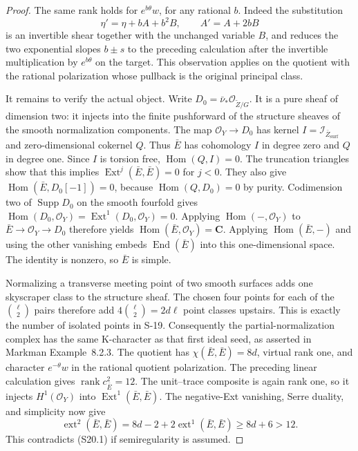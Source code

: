 \begin{proof}
The same rank holds for $e^{b\theta}w$, for any rational $b$.
Indeed the substitution
\[
 \eta' =\eta+bA+b^2B,\qquad A'=A+2bB
\]
is an invertible shear together with the unchanged variable
$B$, and reduces the two exponential slopes $b\pm s$ to
the preceding calculation after the invertible multiplication
by $e^{b\theta}$ on the target. This observation applies on
the quotient with the rational polarization whose pullback
is the original principal class.

It remains to verify the actual object. Write
$D_0=\bar\nu_*\mathcal O_{\widetilde Z/G}$.
It is a pure sheaf of dimension two: it injects into the
finite pushforward of the structure sheaves of the smooth
normalization components. The map $\mathcal O_Y\to D_0$
has kernel $I=\mathcal I_{\bar Z_{\mathrm{surf}}}$ and
zero-dimensional cokernel $Q$. Thus $\bar E$ has cohomology
$I$ in degree zero and $Q$ in degree one.
Since $I$ is torsion free,
$\operatorname{Hom}(Q,I)=0$. The truncation triangles show
that this implies
$\operatorname{Ext}^{j}(\bar E,\bar E)=0$ for $j<0$.
They also give
$\operatorname{Hom}(\bar E,D_0[-1])=0$, because
$\operatorname{Hom}(Q,D_0)=0$ by purity.
Codimension two of $\operatorname{Supp}D_0$ on the smooth
fourfold gives
$\operatorname{Hom}(D_0,\mathcal O_Y)
=\operatorname{Ext}^1(D_0,\mathcal O_Y)=0$.
Applying $\operatorname{Hom}(-,\mathcal O_Y)$ to
$\bar E\to\mathcal O_Y\to D_0$ therefore yields
$\operatorname{Hom}(\bar E,\mathcal O_Y)=\mathbf C$.
Applying $\operatorname{Hom}(\bar E,-)$ and using the other
vanishing embeds $\operatorname{End}(\bar E)$ into this
one-dimensional space. The identity is nonzero, so
$\bar E$ is simple.

Normalizing a transverse meeting point of two smooth
surfaces adds one skyscraper class to the structure sheaf.
The chosen four points for each of the $\binom\ell2$ pairs
therefore add $4\binom\ell2=2d\ell$ point classes upstairs.
This is exactly the number of isolated points in S-19.
Consequently the partial-normalization complex has the same
K-character as that first ideal seed, as asserted in
Markman Example~8.2.3. The quotient has
$\chi(\bar E,\bar E)=8d$, virtual rank one, and character
$e^{-\theta}w$ in the rational quotient polarization.
The preceding linear calculation gives
$\operatorname{rank}c_{\bar E}^2=12$.
The unit--trace composite is again rank one, so it injects
$H^1(\mathcal O_Y)$ into
$\operatorname{Ext}^1(\bar E,\bar E)$.
The negative-Ext vanishing, Serre duality, and simplicity
now give
\[
 \operatorname{ext}^2(\bar E,\bar E)
 =8d-2+2\operatorname{ext}^1(\bar E,\bar E)
 \ge8d+6>12.
\]
This contradicts (S20.1) if semiregularity is assumed.


\end{proof}
